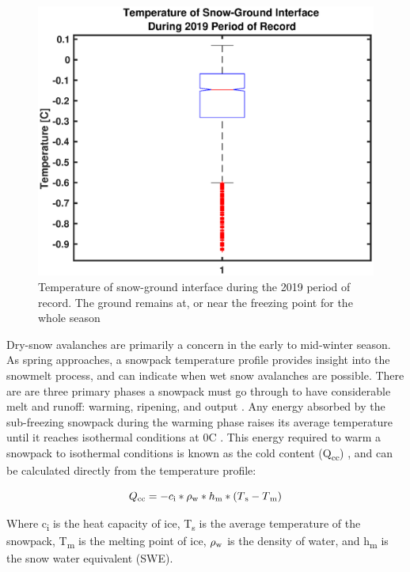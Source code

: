  \begin{figure}[!t]
    \centering
    \includegraphics[width=0.8\linewidth]{figures/TempGrad/GroundTemp.eps}
    \caption{Temperature of snow-ground interface during the 2019 period of record. The ground remains at, or near the freezing point for the whole season}
    \label{fig:GroundTemp}
 \end{figure}

Dry-snow avalanches are primarily a concern in the early to mid-winter season. As spring approaches, a snowpack temperature profile provides insight into the snowmelt process, and can indicate when wet snow avalanches are possible. There are are three primary phases a snowpack must go through to have considerable melt and runoff: warming, ripening, and output \citep{dingman2015}. Any energy absorbed by the sub-freezing snowpack during the warming phase raises its average temperature until it reaches isothermal conditions at 0\textdegree C \citep{dingman2015}. This energy required to warm a snowpack to isothermal conditions is known as the cold content (Q\textsubscript{cc}) \citep{dingman2015}, and can be calculated directly from the temperature profile:

\begin{equation} \label{eq:1}
Q\textsubscript{cc} = -c\textsubscript{i}*\rho\textsubscript{w}*h\textsubscript{m}*(T\textsubscript{s}-T\textsubscript{m})
\end{equation}

Where c\textsubscript{i} is the heat capacity of ice, T\textsubscript{s} is the average temperature of the snowpack, T\textsubscript{m} is the melting point of ice, $\rho\textsubscript{w}$ is the density of water, and h\textsubscript{m} is the snow water equivalent (SWE). 

